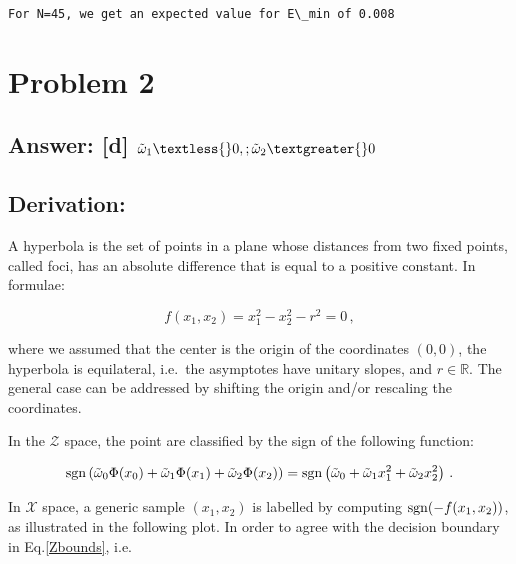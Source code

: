 \documentclass[11pt]{article}
\begin{document}
    \begin{Verbatim}[commandchars=\\\{\}]
For N=45, we get an expected value for E\_min of 0.008
    \end{Verbatim}

    \hypertarget{problem-2}{%
\section{Problem 2}\label{problem-2}}

\hypertarget{answer-d-_10-_20}{%
\subsection{\texorpdfstring{Answer: {[}d{]} $
\tilde{\omega}_1\textless{}0,; \tilde{\omega}_2\textgreater{}0
$}{Answer: {[}d{]} \$ \_1\textless{}0,; \_2\textgreater{}0 \$}}\label{answer-d-_10-_20}}

\hypertarget{derivation}{%
\subsection{Derivation:}\label{derivation}}

A hyperbola is the set of points in a plane whose distances from two
fixed points, called foci, has an absolute difference that is equal to a
positive constant. In formulae:

\begin{equation}
f(x_1,x_2)=x_1^2-x_2^2-r^2=0\,,
\end{equation}

where we assumed that the center is the origin of the coordinates
\((0,0)\), the hyperbola is equilateral, i.e.~the asymptotes have
unitary slopes, and \(r\in \mathbb{R}\). The general case can be
addressed by shifting the origin and/or rescaling the coordinates.

In the \(\mathcal{Z}\) space, the point are classified by the sign of
the following function:

\begin{equation}
\label{Zbounds}
{\rm sgn}\left(\tilde{\omega}_0\Phi(x_0)+\tilde{\omega}_1 \Phi(x_1)+\tilde{\omega}_2 \Phi(x_2)\right)={\rm sgn}\left(\tilde{\omega}_0+\tilde{\omega}_1 x_1^2+\tilde{\omega}_2 x_2^2\right)\,.
\end{equation}

In \(\mathcal{X}\) space, a generic sample \((x_1,x_2)\) is labelled by
computing \({\rm sgn}{(-f(x_1,x_2))}\), as illustrated in the following
plot. In order to agree with the decision boundary in
Eq.\eqref{Zbounds}, i.e.
\end{document}
